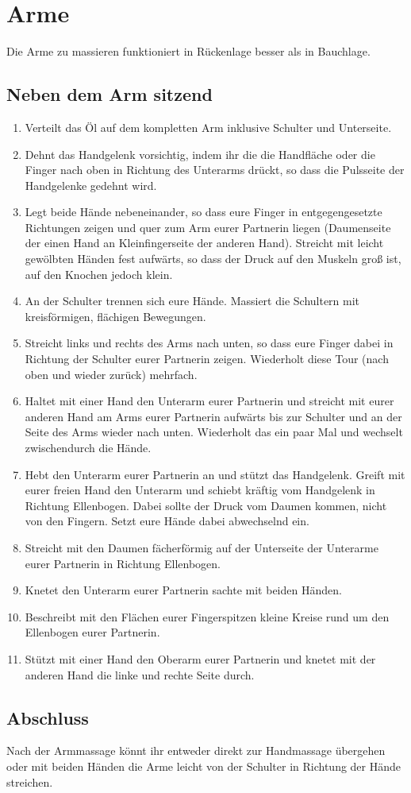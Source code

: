 \section{Arme}
Die Arme zu massieren funktioniert in Rückenlage besser als in Bauchlage.

\subsection{Neben dem Arm sitzend}

\begin{enumerate}
	\item {} Verteilt das Öl auf dem kompletten Arm inklusive Schulter und Unterseite.
	\item {} Dehnt das Handgelenk vorsichtig, indem ihr die die Handfläche oder die Finger nach oben in Richtung des Unterarms drückt, so dass die Pulsseite der Handgelenke gedehnt wird.
	\item {} Legt beide Hände nebeneinander, so dass eure Finger in entgegengesetzte Richtungen zeigen und quer zum Arm eurer Partnerin liegen (Daumenseite der einen Hand an Kleinfingerseite der anderen Hand). Streicht mit leicht gewölbten Händen fest aufwärts, so dass der Druck auf den Muskeln groß ist, auf den Knochen jedoch klein.
	\item {} An der Schulter trennen sich eure Hände. Massiert die Schultern mit kreisförmigen, flächigen Bewegungen.
	\item {} Streicht links und rechts des Arms nach unten, so dass eure Finger dabei in Richtung der Schulter eurer Partnerin zeigen. Wiederholt diese Tour (nach oben und wieder zurück) mehrfach.
	\item {} Haltet mit einer Hand den Unterarm eurer Partnerin und streicht mit eurer anderen Hand am Arms eurer Partnerin aufwärts bis zur Schulter und an der Seite des Arms wieder nach unten. Wiederholt das ein paar Mal und wechselt zwischendurch die Hände.
	\item {} Hebt den Unterarm eurer Partnerin an und stützt das Handgelenk. Greift mit eurer freien Hand den Unterarm und schiebt kräftig vom Handgelenk in Richtung Ellenbogen. Dabei sollte der Druck vom Daumen kommen, nicht von den Fingern. Setzt eure Hände dabei abwechselnd ein.
	\item {} Streicht mit den Daumen fächerförmig auf der Unterseite der Unterarme eurer Partnerin in Richtung Ellenbogen.
	\item {} Knetet den Unterarm eurer Partnerin sachte mit beiden Händen.
	\item {} Beschreibt mit den Flächen eurer Fingerspitzen kleine Kreise rund um den Ellenbogen eurer Partnerin.
	\item {} Stützt mit einer Hand den Oberarm eurer Partnerin und knetet mit der anderen Hand die linke und rechte Seite durch.
\end{enumerate}

\subsection{Abschluss}
Nach der Armmassage könnt ihr entweder direkt zur Handmassage übergehen oder mit beiden Händen die Arme leicht von der Schulter in Richtung der Hände streichen.
